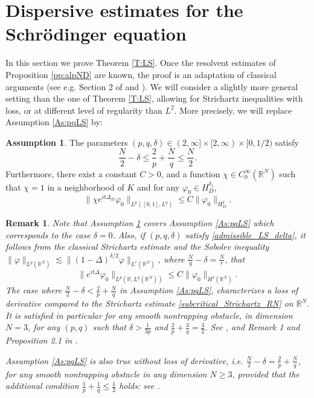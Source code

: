 \documentclass[10pt,leqno]{amsart}
\newtheorem{remark}[theorem]{Remark}
\theoremstyle{definition}%
\newtheorem{assumption}{Assumption}
\theoremstyle{remark}
\numberwithin{equation}{section}
\newcommand{\R}{\mathbb{R}}
\renewcommand{\^}{\widehat}%
\begin{document}
\section{Dispersive estimates for the Schr\"odinger equation}
\label{S:LS}
In this section we prove Theorem \ref{T:LS}. Once the resolvent estimates of Proposition \ref{pp:alpND} are known, 
the proof is an adaptation of classical arguments (see e.g. Section 2 of \cite{BuGeTz04a} and \cite{RodnianskiSchlag04}). We will consider a slightly more general setting than the one of Theorem \ref{T:LS}, allowing for Strichartz inequalities with loss, or at different level of regularity than $L^2$. More precisely, we will replace Assumption \ref{As:pqLS} by:
\begin{assumption}
\label{As:pqLS'}
The parameters $(p,q,\delta)\in (2,\infty]\times [2,\infty)\times [0,1/2)$ satisfy
\begin{equation}
 \label{admissible_LS_delta}
 \frac{N}{2}-\delta\leq \frac{2}{p}+\frac{N}{q}\leq \frac{N}{2}.
\end{equation}
Furthermore,  there exist a constant  $C>0$, and a function $\chi\in C_0^{\infty}(\R^N)$ such that $\chi=1$ in a neighborhood of $K$ and for any $\varphi_0\in H_D^{\delta_1}$,
\begin{equation}
\label{local_Strichartz_LS'}
\|\chi e^{it\Delta_D}\varphi_0\|_{L^{p}([0,1],L^{q})}\leq C\|\varphi_0\|_{H_D^{\delta}}.
\end{equation}
\end{assumption}
\begin{remark}
Note that Assumption \ref{As:pqLS'} covers Assumption \ref{As:pqLS} which corresponds to the case $\delta=0$. Also, if $(p,q,\delta)$ satisfy \eqref{admissible_LS_delta}, it follows from the classical Strichartz estimate and the Sobolev inequality $\|\varphi\|_{L^q(\R^N)}\lesssim \|(1-\Delta)^{\delta/2}\varphi\|_{L^r(\R^N)}$, where $\frac{N}{q}-\delta=\frac{N}{r}$, that
\begin{equation}
\label{subcritical_Strichartz_RN}
\|e^{it\Delta}\varphi_0\|_{L^{p}(\R,L^{q}(\R^N))}\leq C\|\varphi_0\|_{H^{\delta}(\R^N)}.
\end{equation}
The case where $\frac{N}{2}-\delta<\frac{2}{p}+\frac{N}{q}$ in Assumption \ref{As:pqLS}, characterizes a loss of derivative compared to the Strichartz estimate \eqref{subcritical_Strichartz_RN} on $\R^N$. It is satisfied in particular for any smooth nontrapping obstacle, in dimension $N=3$, for any $(p,q)$ such that $\delta>\frac{1}{3p}$ and $\frac{2}{p}+\frac{3}{q}=\frac{3}{2}$. See \cite{BlSmSo08}, and Remark 1 and Proposition 2.1 in \cite{Anton08}.

Assumption \ref{As:pqLS} is also true without loss of derivative, i.e. $\frac{N}{2}-\delta=\frac{2}{p}+\frac{N}{q}$, for any smooth nontrapping obstacle in any dimension $N\geq 3$, provided that the additional condition $\frac{1}{p}+\frac{1}{q}\leq \frac{1}{2}$ holds: see \cite{BlSmSo12}.
\end{remark}
\end{document}
